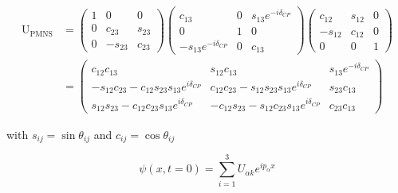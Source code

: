 \begin{align} %
    \mathrm{U}_{\mathrm{PMNS}} & =
    \begin{pmatrix}
        1 & 0       & 0      \\
        0 & c_{23}  & s_{23} \\
        0 & -s_{23} & c_{23}
    \end{pmatrix}
    \begin{pmatrix}
        c_{13}                   & 0 & s_{13}e^{-i\delta_{CP}} \\
        0                        & 1 & 0                       \\
        -s_{13}e^{-i\delta_{CP}} & 0 & c_{13}
    \end{pmatrix}
    \begin{pmatrix}
        c_{12}  & s_{12} & 0 \\
        -s_{12} & c_{12} & 0 \\
        0       & 0      & 1
    \end{pmatrix}
    \\
                               & =
    \begin{pmatrix}
        c_{12}c_{13}
         & s_{12}c_{13}
         & s_{13}e^{-i\delta_{CP}}                          \\
        -s_{12}c_{23}-c_{12}s_{23}s_{13}e^{i\delta_{CP}}
         & c_{12}c_{23}-s_{12}s_{23}s_{13}e^{i\delta_{CP}}
         & s_{23}c_{13}                                     \\
        s_{12}s_{23}-c_{12}c_{23}s_{13}e^{i\delta_{CP}}
         & -c_{12}s_{23}-s_{12}c_{23}s_{13}e^{i\delta_{CP}}
         & c_{23}c_{13}
    \end{pmatrix}
\end{align} %


with $s_{ij}=\sin \theta_{ij}$ and $c_{ij}=\cos \theta_{ij}$

\begin{equation} %
    \psi(x,t=0)=\sum_{i=1}^{3}U_{\alpha k}e^{ip_{\alpha}x}
\end{equation} %

